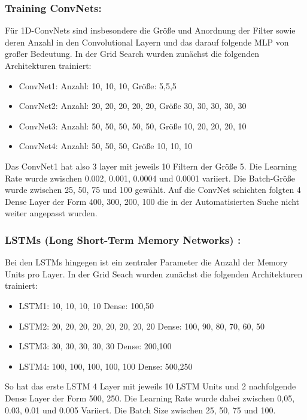 \documentclass[acmtog, authorversion]{acmart} %
\begin{document}
\subsubsection{Training ConvNets: }
Für 1D-ConvNets sind insbesondere die Größe und Anordnung der Filter sowie deren Anzahl in den Convolutional Layern und das darauf folgende MLP von großer Bedeutung. 
In der Grid Search wurden zunächst die folgenden Architekturen trainiert:
\begin{itemize}
    \item ConvNet1: Anzahl: 10, 10, 10, Größe: 5,5,5 
    \item ConvNet2: Anzahl: 20, 20, 20, 20, 20, Größe 30, 30, 30, 30, 30
    \item ConvNet3: Anzahl: 50, 50, 50, 50, 50, Größe 10, 20, 20, 20, 10
    \item ConvNet4: Anzahl: 50, 50, 50,  Größe 10, 10, 10
\end{itemize}
Das ConvNet1 hat also 3 layer mit jeweils 10 Filtern der Größe 5.
Die Learning Rate wurde zwischen 0.002, 0.001, 0.0004 und 0.0001 variiert. Die Batch-Größe wurde zwischen 25, 50, 75 und 100 gewählt.
Auf die ConvNet schichten folgten 4 Dense Layer der Form 400, 300, 200, 100 die in der Automatisierten Suche nicht weiter angepasst wurden.
\subsubsection{LSTMs (Long Short-Term Memory Networks) :}
Bei den LSTMs hingegen ist ein zentraler Parameter die Anzahl der Memory Units pro Layer. In der Grid Seach wurden zunächst die folgenden Architekturen trainiert:
\begin{itemize}
    \item LSTM1: 10, 10, 10, 10 Dense: 100,50
    \item LSTM2: 20, 20, 20, 20, 20, 20, 20, 20 Dense: 100, 90, 80, 70, 60, 50
    \item LSTM3: 30, 30, 30, 30, 30 Dense: 200,100
    \item LSTM4: 100, 100, 100, 100, 100 Dense: 500,250
\end{itemize}
So hat das erste LSTM 4 Layer mit jeweils 10 LSTM Units und 2 nachfolgende Dense Layer der Form 500, 250. Die Learning Rate wurde dabei zwischen 0,05, 0.03, 0.01 und 0.005 Variiert. Die Batch Size zwischen 25, 50, 75 und 100.
\end{document}
